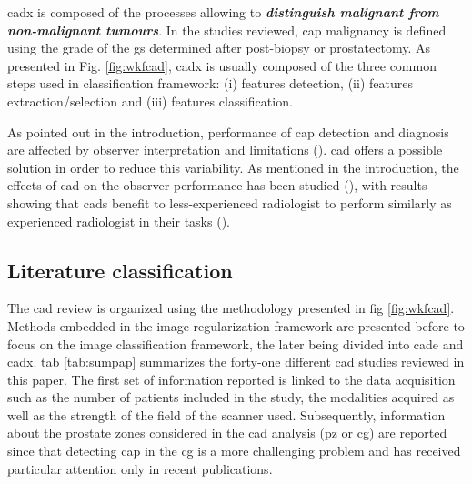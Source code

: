 \Ac{cadx} is composed of the processes allowing to \textbf{\textit{distinguish malignant from non-malignant tumours}}. In the studies reviewed, \ac{cap} malignancy is defined using the grade of the \ac{gs} determined after post-biopsy or prostatectomy. As presented in Fig. \ref{fig:wkfcad}, \ac{cadx} is usually composed of the three common steps used in classification framework: (i) features detection, (ii) features extraction/selection and (iii) features classification.

As pointed out in the introduction, performance of \ac{cap} detection and diagnosis are affected by observer interpretation and limitations (\cite{Giger2008,Hambrock2013}). \ac{cad} offers a possible solution in order to reduce this variability. As mentioned in the introduction, the effects of \ac{cad} on the observer performance has been studied (\cite{Hambrock2013}), with results showing that \acp{cad} benefit to less-experienced radiologist to perform similarly as experienced radiologist in their tasks (\cite{Hambrock2013}). 

\subsection{Literature classification}

The \ac{cad} review is organized using the methodology presented in \acs{fig} \ref{fig:wkfcad}. Methods embedded in the image regularization framework are presented before to focus on the image classification framework, the later being divided into \ac{cade} and \ac{cadx}. %
\Acl{tab} \ref{tab:sumpap} summarizes the forty-one different \ac{cad} studies reviewed in this paper. The first set of information reported is linked to the data acquisition such as the number of patients included in the study, the modalities acquired as well as the strength of the field of the scanner used. Subsequently, information about the prostate zones considered in the \ac{cad} analysis (\ac{pz} or \ac{cg}) are reported since that detecting \ac{cap} in the \ac{cg} is a more challenging problem and has received particular attention only in recent publications.
